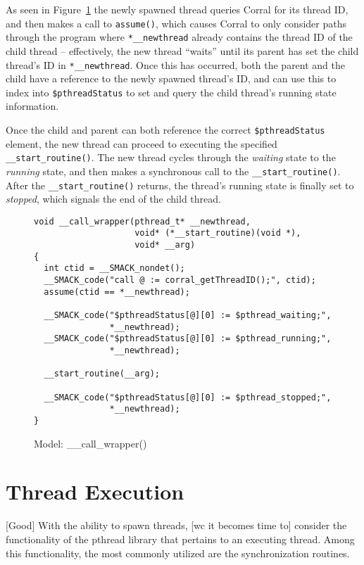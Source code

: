 As seen in Figure~\ref{fig:__call_wrapper} the newly spawned thread
queries Corral for its thread ID, and then makes a call to
\lstinline|assume()|, which causes Corral to only consider paths
through the program where \lstinline|*__newthread| already contains
the thread ID of the child thread -- effectively, the new thread
``waits'' until its parent has set the child thread's ID in
\lstinline|*__newthread|. Once this has occurred, both the parent and
the child have a reference to the newly spawned thread's ID, and can
use this to index into \lstinline|$pthreadStatus| to set and query the
child thread's running state information.  

Once the child and parent can both reference the correct
\lstinline|$pthreadStatus| element, the new thread can proceed to
executing the specified \lstinline|__start_routine()|.  The new thread
cycles through the \emph{waiting} state to the \emph{running} state,
and then makes a synchronous call to the
\lstinline|__start_routine()|.  After the
\lstinline|__start_routine()| returns, the thread's running state is
finally set to \emph{stopped}, which signals the end of the child
thread. 

\begin{figure}[h]
\centering
\caption{Model: \_\_call\_wrapper()}\label{fig:__call_wrapper}
\begin{lstlisting}
void __call_wrapper(pthread_t* __newthread,
                    void* (*__start_routine)(void *),
                    void* __arg)
{
  int ctid = __SMACK_nondet();
  __SMACK_code("call @ := corral_getThreadID();", ctid);
  assume(ctid == *__newthread);
  
  __SMACK_code("$pthreadStatus[@][0] := $pthread_waiting;",
               *__newthread);
  __SMACK_code("$pthreadStatus[@][0] := $pthread_running;",
               *__newthread);

  __start_routine(__arg);

  __SMACK_code("$pthreadStatus[@][0] := $pthread_stopped;",
               *__newthread);
}
\end{lstlisting}
\end{figure}



\section{Thread Execution}
[Good]
With the ability to spawn threads, [wc it becomes time to] consider
the functionality of the pthread library that pertains to an executing
thread.  Among this functionality, the most commonly utilized are the
synchronization routines.

